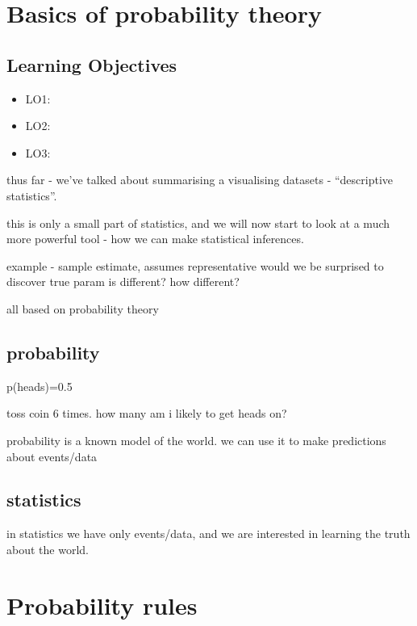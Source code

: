 \documentclass[]{book}
\providecommand{\tightlist}{%
  \setlength{\itemsep}{0pt}\setlength{\parskip}{0pt}}
\begin{document}
\hypertarget{chap-probability-theory}{%
\chapter{Basics of probability theory}\label{chap-probability-theory}}

\hypertarget{learning-objectives-5}{%
\section*{Learning Objectives}\label{learning-objectives-5}}

\begin{itemize}
\tightlist
\item
  LO1:
\item
  LO2:
\item
  LO3:
\end{itemize}

thus far - we've talked about summarising a visualising datasets - ``descriptive statistics''.

this is only a small part of statistics, and we will now start to look at a much more powerful tool - how we can make statistical inferences.

example -
sample estimate, assumes representative
would we be surprised to discover true param is different? how different?

all based on probability theory

\hypertarget{probability}{%
\section{probability}\label{probability}}

p(heads)=0.5

toss coin 6 times. how many am i likely to get heads on?

probability is a known model of the world.
we can use it to make predictions about events/data

\hypertarget{statistics}{%
\section{statistics}\label{statistics}}

in statistics we have only events/data, and we are interested in learning the truth about the world.

\hypertarget{chap-probability-rules}{%
\chapter{Probability rules}\label{chap-probability-rules}}
\end{document}

